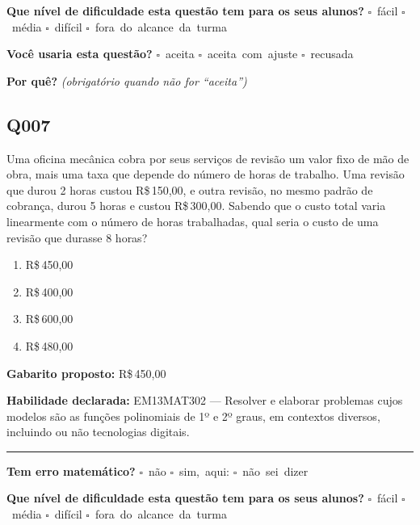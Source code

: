 \documentclass[11pt,a4paper]{article}
\begin{document}
\textbf{Que nível de dificuldade esta questão tem para os seus alunos?}\quad
\mbox{$\square$~fácil} \quad \mbox{$\square$~média} \quad
\mbox{$\square$~difícil} \quad \mbox{$\square$~fora do alcance da turma}

\textbf{Você usaria esta questão?}\quad
\mbox{$\square$~aceita} \quad \mbox{$\square$~aceita com ajuste} \quad
\mbox{$\square$~recusada}

\textbf{Por quê?} \emph{(obrigatório quando não for ``aceita'')}

\underline{\hspace{\linewidth}}

\underline{\hspace{\linewidth}}
\vspace{0.6em}

\begin{samepage}
\subsection*{Q007}
Uma oficina mecânica cobra por seus serviços de revisão um valor fixo de mão de obra, mais uma taxa que depende do número de horas de trabalho. Uma revisão que durou 2 horas custou R\$\,150,00, e outra revisão, no mesmo padrão de cobrança, durou 5 horas e custou R\$\,300,00. Sabendo que o custo total varia linearmente com o número de horas trabalhadas, qual seria o custo de uma revisão que durasse 8 horas?
\begin{enumerate}[label=(\alph*),nosep,leftmargin=*]
\item R\$\,450,00
\item R\$\,400,00
\item R\$\,600,00
\item R\$\,480,00
\end{enumerate}

\textbf{Gabarito proposto:} R\$\,450,00

\textbf{Habilidade declarada:} EM13MAT302 --- Resolver e elaborar problemas cujos modelos são as funções polinomiais de 1º e 2º graus, em contextos diversos, incluindo ou não tecnologias digitais.
\end{samepage}

\noindent\rule{\linewidth}{0.4pt}
\textbf{Tem erro matemático?}\quad
\mbox{$\square$~não} \quad \mbox{$\square$~sim, aqui:} \underline{\hspace{5cm}}
\quad \mbox{$\square$~não sei dizer}

\textbf{Que nível de dificuldade esta questão tem para os seus alunos?}\quad
\mbox{$\square$~fácil} \quad \mbox{$\square$~média} \quad
\mbox{$\square$~difícil} \quad \mbox{$\square$~fora do alcance da turma}
\end{document}

